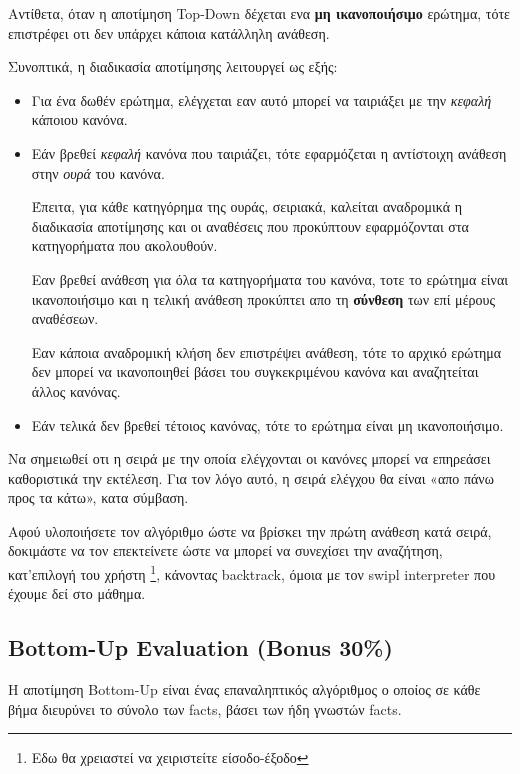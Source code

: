 \documentclass[10pt]{article}
\begin{document}
Αντίθετα, όταν η αποτίμηση Top-Down δέχεται ενα \textbf{μη ικανοποιήσιμο} ερώτημα, τότε επιστρέφει οτι δεν υπάρχει κάποια κατάλληλη ανάθεση.\

Συνοπτικά, η διαδικασία αποτίμησης λειτουργεί ως εξής:\

\begin{itemize}
    \item Για ένα δωθέν ερώτημα, ελέγχεται εαν αυτό μπορεί να ταιριάξει με την \textit{κεφαλή} κάποιου κανόνα.\
    \item Εάν βρεθεί \textit{κεφαλή} κανόνα που ταιριάζει, τότε εφαρμόζεται η αντίστοιχη ανάθεση στην \textit{ουρά} του κανόνα.\

    Έπειτα, για κάθε κατηγόρημα της ουράς, σειριακά, καλείται αναδρομικά η διαδικασία αποτίμησης και οι αναθέσεις που προκύπτουν εφαρμόζονται στα κατηγορήματα που ακολουθούν.\

    Εαν βρεθεί ανάθεση για όλα τα κατηγορήματα του κανόνα, τοτε το ερώτημα είναι ικανοποιήσιμο και η τελική ανάθεση προκύπτει απο τη \textbf{σύνθεση} των επί μέρους αναθέσεων.

    Εαν κάποια αναδρομική κλήση δεν επιστρέψει ανάθεση, τότε το αρχικό ερώτημα δεν μπορεί να ικανοποιηθεί βάσει του συγκεκριμένου κανόνα και αναζητείται άλλος κανόνας.\

    \item Εάν τελικά δεν βρεθεί τέτοιος κανόνας, τότε το ερώτημα είναι μη ικανοποιήσιμο. 

\end{itemize}

Να σημειωθεί οτι η σειρά με την οποία ελέγχονται οι κανόνες μπορεί να επηρεάσει καθοριστικά την εκτέλεση. Για τον λόγο αυτό, η σειρά ελέγχου θα είναι «απο πάνω προς τα κάτω», κατα σύμβαση.\

Αφού υλοποιήσετε τον αλγόριθμο ώστε να βρίσκει την πρώτη ανάθεση κατά σειρά, δοκιμάστε να τον επεκτείνετε ώστε να μπορεί να συνεχίσει την αναζήτηση, κατ'επιλογή του χρήστη \footnote{Εδω θα χρειαστεί να χειριστείτε είσοδο-έξοδο}, κάνοντας backtrack, όμοια με τον swipl interpreter που έχουμε δεί στο μάθημα.\



\subsection*{Bottom-Up Evaluation (Bonus 30\%)}

H αποτίμηση Bottom-Up είναι ένας επαναληπτικός αλγόριθμος ο οποίος σε κάθε βήμα διευρύνει το σύνολο των facts, βάσει των ήδη γνωστών facts.\
\end{document}
